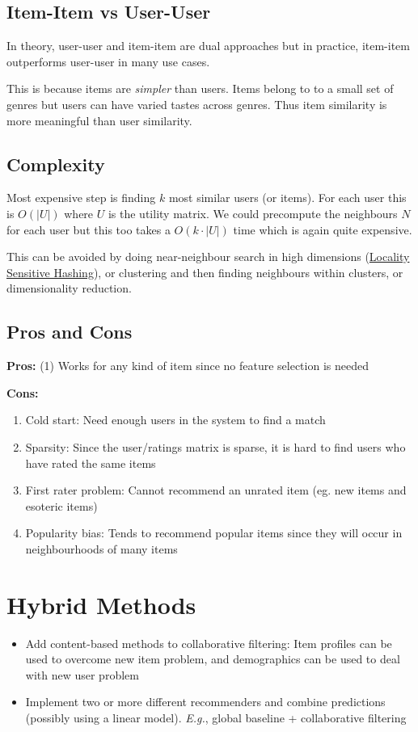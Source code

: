 \documentclass{article}
\begin{document}
\subsection{Item-Item vs User-User}
In theory, user-user and item-item are dual approaches but in practice, item-item outperforms user-user in many use cases.

This is because items are \textit{simpler} than users. Items belong to to a small set of genres but users can have varied tastes across genres. Thus item similarity is more meaningful than user similarity.

\subsection{Complexity}
Most expensive step is finding $k$ most similar users (or items). For each user this is $O(|U|)$ where $U$ is the utility matrix. We could precompute the neighbours $N$ for each user but this too takes a $O(k\cdot|U|)$ time which is again quite expensive.

This can be avoided by doing near-neighbour search in high dimensions (\href{https://en.wikipedia.org/wiki/Locality-sensitive_hashing}{Locality Sensitive Hashing}), or clustering and then finding neighbours within clusters, or dimensionality reduction.

\subsection{Pros and Cons}
\textbf{Pros:} (1) Works for any kind of item since no feature selection is needed

\textbf{Cons:} 
\begin{enumerate}[label=(\arabic*), topsep=0in]
\item Cold start: Need enough users in the system to find a match
\item Sparsity: Since the user/ratings matrix is sparse, it is hard to find users who have rated the same items
\item First rater problem: Cannot recommend an unrated item (eg. new items and esoteric items)
\item Popularity bias: Tends to recommend popular items since they will occur in neighbourhoods of many items
\end{enumerate}

\section{Hybrid Methods}
\begin{itemize}
    \item Add content-based methods to collaborative filtering: Item profiles can be used to overcome new item problem, and demographics can be used to deal with new user problem
    \item Implement two or more different recommenders and combine predictions (possibly using a linear model). \textit{E.g.}, global baseline + collaborative filtering
\end{itemize}
\end{document}

